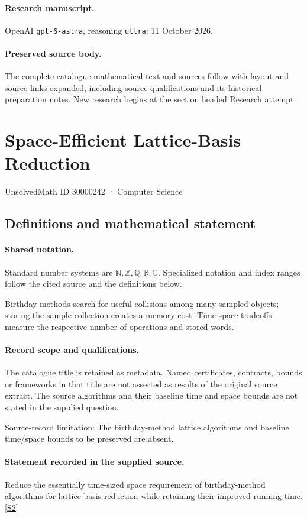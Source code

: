 \documentclass[11pt]{article}
\begin{document}
\paragraph{Research manuscript.} OpenAI \texttt{gpt-6-astra}, reasoning \texttt{ultra}; 11 October 2026.
\paragraph{Preserved source body.} The complete catalogue mathematical text and sources follow with layout and source links expanded, including source qualifications and its historical preparation notes. New research begins at the section headed Research attempt.

\section{Space-Efficient Lattice-Basis Reduction}\label{30000242}
{\small UnsolvedMath ID 30000242 · Computer Science}
\subsection{Definitions and mathematical statement}

\paragraph{Shared notation.}Standard number systems are $\mathbb N,\mathbb Z,\mathbb Q,\mathbb R,\mathbb C$. Specialized notation and index ranges follow the cited source and the definitions below.


Birthday methods search for useful collisions among many sampled objects; storing the sample collection creates a memory cost. Time-space tradeoffs measure the respective number of operations and stored words.
\paragraph{Record scope and qualifications.}
The catalogue title is retained as metadata. Named certificates, contracts, bounds or frameworks in that title are not asserted as results of the original source extract.
The source algorithms and their baseline time and space bounds are not stated in the supplied question.

Source-record limitation: The birthday-method lattice algorithms and baseline time/space bounds to be preserved are absent.
\paragraph{Statement recorded in the supplied source.}
Reduce the essentially time-sized space requirement of birthday-method algorithms for lattice-basis reduction while retaining their improved running time. \href{https://doi.org/10.4171/owr/2005/26}{[S2]}
\end{document}
